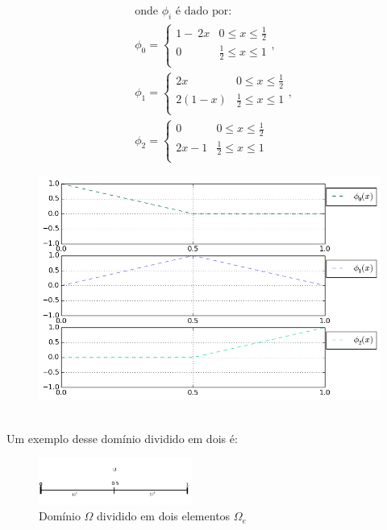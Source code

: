 \begin{figure}
  \begin{minipage}{.5\textwidth}
	\begin{align*}
	& \text{onde\ } \phi_i \text{\ é dado por:}\\
	& \phi_0=
	\begin{cases} 
	     1-\ 2x & 0 \leq x\leq \frac{1}{2} \\
	      0  & \frac{1}{2}  \leq x \leq 1 \\
	\end{cases},\\ 
	& \phi_1=
	\begin{cases} 
	     2x & 0 \leq x\leq \frac{1}{2} \\
	      2(1-x)  & \frac{1}{2}  \leq x \leq 1 \\
	\end{cases},\\
	& \phi_2=
	\begin{cases} 
	     0 & 0 \leq x\leq \frac{1}{2} \\
	     2x-1  & \frac{1}{2}  \leq x \leq 1 \\
	\end{cases}
	\end{align*}
  \end{minipage}%
  \begin{minipage}{.5\textwidth}
    \centering
     \includegraphics[width=1\textwidth, center]{figuras/phis_elementos_finitos.png}
    
  \end{minipage}
\end{figure}
\pagebreak \\
 Um exemplo desse domínio dividido em dois é:
\begin{figure}[h]
 \includegraphics[width=0.45\textwidth, center]{figuras/2_elementos_finitos.png}
\caption{Domínio $\Omega$ dividido em dois elementos $\Omega_e$}
 \end{figure}\\
